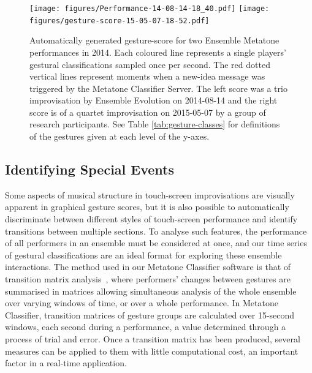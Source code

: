 \documentclass[graybox]{svmult}
\begin{document}

\begin{figure}
\centering
\texttt{[image: figures/Performance-14-08-14-18\_40.pdf]}
\texttt{[image: figures/gesture-score-15-05-07-18-52.pdf]}
\caption{Automatically generated gesture-score for two Ensemble
  Metatone performances in 2014. Each coloured line represents a
  single players' gestural classifications sampled once per second.
  The red dotted vertical lines represent moments when a new-idea
  message was triggered by the Metatone Classifier Server. The left
  score was a trio improvisation by Ensemble Evolution on 2014-08-14
  and the right score is of a quartet improvisation on 2015-05-07 by a
  group of research participants. See Table \ref{tab:gesture-classes}
  for definitions of the gestures given at each level of the y-axes.}
\label{gesturescore}
\end{figure}


\subsection{Identifying Special Events}
\label{subsec:special-events}

Some aspects of musical structure in touch-screen improvisations are
visually apparent in graphical gesture scores, but it is also possible
to automatically discriminate between different styles of touch-screen
performance and identify transitions between multiple sections. To
analyse such features, the performance of all performers in an
ensemble must be considered at once, and our time series of gestural
classifications are an ideal format for exploring these ensemble
interactions. The method used in our Metatone Classifier software is
that of transition matrix analysis~\cite{Swift:2014tya}, where
performers' changes between gestures are summarised in matrices
allowing simultaneous analysis of the whole ensemble over varying
windows of time, or over a whole performance. In Metatone Classifier,
transition matrices of gesture groups are calculated over 15-second
windows, each second during a performance, a value determined through
a process of trial and error. Once a transition matrix has been
produced, several measures can be applied to them with little
computational cost, an important factor in a real-time application.
\end{document}
